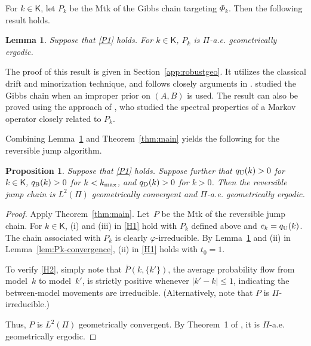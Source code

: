 \documentclass[12pt]{article}
\newcommand{\df}{\mathrm{d}}
\newcommand{\Z}{\mathsf{Z}}
\newtheorem{lemma}[theorem]{Lemma}
\newtheorem{proposition}[theorem]{Proposition}
\begin{document}
For $k \in \mathsf{K}$, let $P_k$ be the Mtk of the Gibbs chain targeting $\Phi_k$.
Then the following result holds.



\begin{lemma} \label{lem:robustgeo}
	Suppose that \ref{P1} holds.
	For $k \in \mathsf{K}$, $P_k$ is $\Pi$-a.e. geometrically ergodic.
\end{lemma}

The proof of this result is given in Section~\ref{app:robustgeo}.
It utilizes the classical drift and minorization technique, and follows closely arguments in \cite{roy2010monte}.
\cite{roy2010monte} studied the Gibbs chain when an improper prior on $(A,B)$ is used.
The result can also be proved using the approach of \cite{choi2013analysis}, who studied the spectral properties of a Markov operator closely related to $P_k$.

Combining Lemma~\ref{lem:robustgeo} and Theorem~\ref{thm:main} yields the following for the reversible jump algorithm.

\begin{proposition} \label{pro:ar}
	Suppose that \ref{P1} holds.
	Suppose further that $q_{\scriptsize\mbox{U}}(k) > 0$ for $k \in \mathsf{K}$, $q_{\scriptsize\mbox{B}}(k) > 0$ for $k < k_{\scriptsize \mbox{max}}$, and $q_{\scriptsize\mbox{D}}(k) > 0$ for $k > 0$.
	Then the reversible jump chain is $L^2(\Pi)$ geometrically convergent and $\Pi$-a.e. geometrically ergodic.
\end{proposition}
\begin{proof}
	Apply Theorem~\ref{thm:main}.
	Let~$P$ be the Mtk of the reversible jump chain.
	For $k \in \mathsf{K}$, (i) and (iii) in \ref{H1} hold with $P_k$ defined above and $c_k = q_{\scriptsize\mbox{U}}(k)$.
	The chain associated with $P_k$ is clearly $\varphi$-irreducible.
	By Lemma~\ref{lem:robustgeo} and (ii) in Lemma~\ref{lem:Pk-convergence}, (ii) in \ref{H1} holds with $t_0 = 1$.
	
	To verify \ref{H2}, simply note that $\bar{P}(k,\{k'\})$, the average probability flow from model~$k$ to model~$k'$, is strictly positive whenever $|k'-k| \leq 1$, indicating the between-model movements are irreducible.
	(Alternatively, note that $P$ is $\Pi$-irreducible.)
	
	
	
	Thus, $P$ is $L^2(\Pi)$ geometrically convergent.
	By Theorem~1 of \cite{roberts2001geometric}, it is $\Pi$-a.e. geometrically ergodic.
\end{proof}
\end{document}
